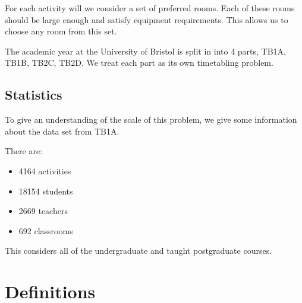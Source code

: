 \documentclass[12pt]{article}
\theoremstyle{definition}
\theoremstyle{plain}
\begin{document}
For each activity will we consider a set of preferred rooms. Each of these rooms should be large enough and satisfy equipment requirements. This allows us to choose any room from this set.

The academic year at the University of Bristol is split in into 4 parts, TB1A, TB1B, TB2C, TB2D. We treat each part as its own timetabling problem.


\subsection{Statistics}

To give an understanding of the scale of this problem, we give some information about the data set from TB1A.

There are:
\begin{itemize}
	\item 4164 activities
	\item 18154 students
	\item 2669 teachers
	\item 692 classrooms
\end{itemize}

This considers all of the undergraduate and taught postgraduate courses.

\section{Definitions}
\end{document}
